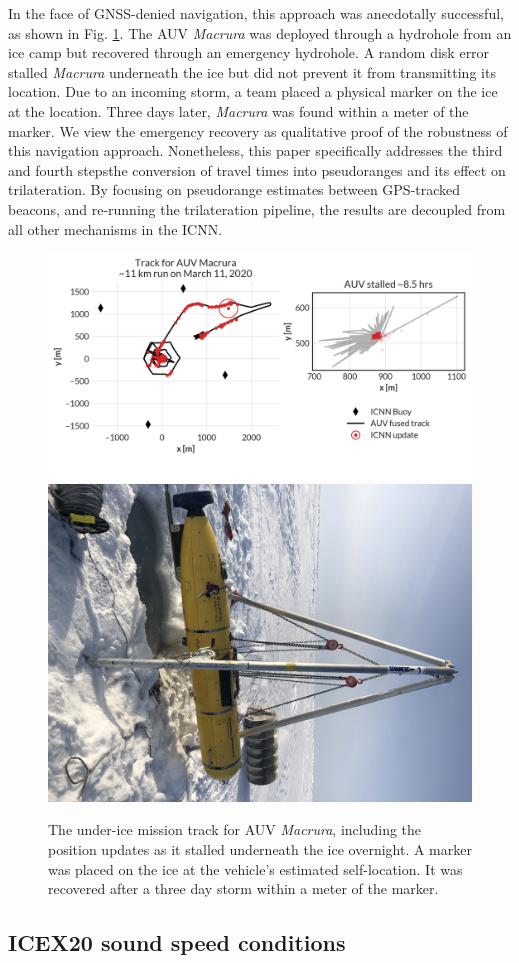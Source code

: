 In the face of GNSS-denied navigation, this approach was anecdotally successful, as shown in Fig. \ref{fig:vehicleRecovery}.
The AUV \emph{Macrura} was deployed through a hydrohole from an ice camp but recovered through an emergency hydrohole.
A random disk error stalled \emph{Macrura} underneath the ice but did not prevent it from transmitting its location.
Due to an incoming storm, a team placed a physical marker on the ice at the location.
Three days later, \emph{Macrura} was found within a meter of the marker.
We view the emergency recovery as qualitative proof of the robustness of this navigation approach.
Nonetheless, this paper specifically addresses the third and fourth steps\textemdash the conversion of travel times into pseudoranges and its effect on trilateration.
By focusing on pseudorange estimates between GPS-tracked beacons, and re-running the trilateration pipeline, the results are decoupled from all other mechanisms in the ICNN.

\begin{figure}[h!]
	\centering
	\includegraphics[width=0.7\columnwidth]{figs/auv-track-update.png} \hfill
	\includegraphics[width=0.28\columnwidth]{figs/Fig1.jpg}
	\caption{The under-ice mission track for AUV \emph{Macrura}, including the position updates as it stalled underneath the ice overnight. A marker was placed on the ice at the vehicle's estimated self-location. It was recovered after a three day storm within a meter of the marker.}
	\label{fig:vehicleRecovery}
\end{figure}

\subsection{ICEX20 sound speed conditions}

